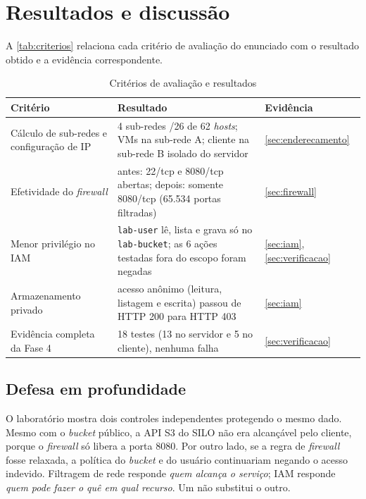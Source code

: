 \chapter{Resultados e discussão}

A \autoref{tab:criterios} relaciona cada critério de avaliação do enunciado com o
resultado obtido e a evidência correspondente.

\begin{table}[htbp]
  \centering
  \caption{Critérios de avaliação e resultados}\label{tab:criterios}
  \begin{tabular}{L{0.3\textwidth}L{0.38\textwidth}L{0.2\textwidth}}
    \hline
    \textbf{Critério} & \textbf{Resultado} & \textbf{Evidência} \\
    \hline
    Cálculo de sub-redes e configuração de IP & 4 sub-redes /26 de 62 \textit{hosts}; VMs na sub-rede A; cliente na sub-rede B isolado do servidor & \autoref{sec:enderecamento} \\
    Efetividade do \textit{firewall} & antes: 22/tcp e 8080/tcp abertas; depois: somente 8080/tcp (65.534 portas filtradas) & \autoref{sec:firewall} \\
    Menor privilégio no IAM & \texttt{lab-user} lê, lista e grava só no \texttt{lab-bucket}; as 6 ações testadas fora do escopo foram negadas & \autoref{sec:iam}, \autoref{sec:verificacao} \\
    Armazenamento privado & acesso anônimo (leitura, listagem e escrita) passou de HTTP 200 para HTTP 403 & \autoref{sec:iam} \\
    Evidência completa da Fase 4 & 18 testes (13 no servidor e 5 no cliente), nenhuma falha & \autoref{sec:verificacao} \\
    \hline
  \end{tabular}
\end{table}

\section{Defesa em profundidade}

O laboratório mostra dois controles independentes protegendo o mesmo dado. Mesmo com o
\textit{bucket} público, a API S3 do SILO não era alcançável pelo cliente, porque o
\textit{firewall} só libera a porta 8080. Por outro lado, se a regra de \textit{firewall}
fosse relaxada, a política do \textit{bucket} e do usuário continuariam negando o acesso
indevido. Filtragem de rede responde \emph{quem alcança o serviço}; IAM responde
\emph{quem pode fazer o quê em qual recurso}. Um não substitui o outro.

